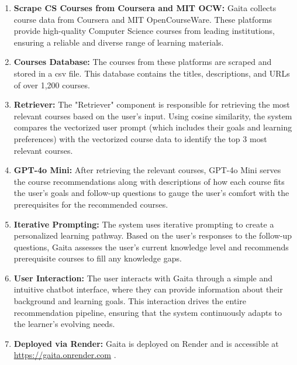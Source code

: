 \begin{enumerate}
\item \textbf{Scrape CS Courses from Coursera and MIT OCW:} Gaita collects course data from Coursera and MIT OpenCourseWare. These platforms provide high-quality Computer Science courses from leading institutions, ensuring a reliable and diverse range of learning materials.  

\item \textbf{Courses Database:} The courses from these platforms are scraped and stored in a csv file. This database contains the titles, descriptions, and URLs of over 1,200 courses.

\item \textbf{Retriever:} The "Retriever" component is responsible for retrieving the most relevant courses based on the user’s input. Using cosine similarity, the system compares the vectorized user prompt (which includes their goals and learning preferences) with the vectorized course data to identify the top 3 most relevant courses.


\item \textbf{GPT-4o Mini:} After retrieving the relevant courses, GPT-4o Mini serves the course recommendations along with descriptions of how each course fits the user’s goals and follow-up questions to gauge the user's comfort with the prerequisites for the recommended courses. 

\item \textbf{Iterative Prompting:} The system uses iterative prompting to create a personalized learning pathway. Based on the user's responses to the follow-up questions, Gaita assesses the user’s current knowledge level and recommends prerequisite courses to fill any knowledge gaps. 

\item \textbf{User Interaction:} The user interacts with Gaita through a simple and intuitive chatbot interface, where they can provide information about their background and learning goals. This interaction drives the entire recommendation pipeline, ensuring that the system continuously adapts to the learner's evolving needs.

\item \textbf{Deployed via Render:} Gaita is deployed on Render and is accessible at \url{https://gaita.onrender.com} \footnotemark[1]. 

\end{enumerate}



